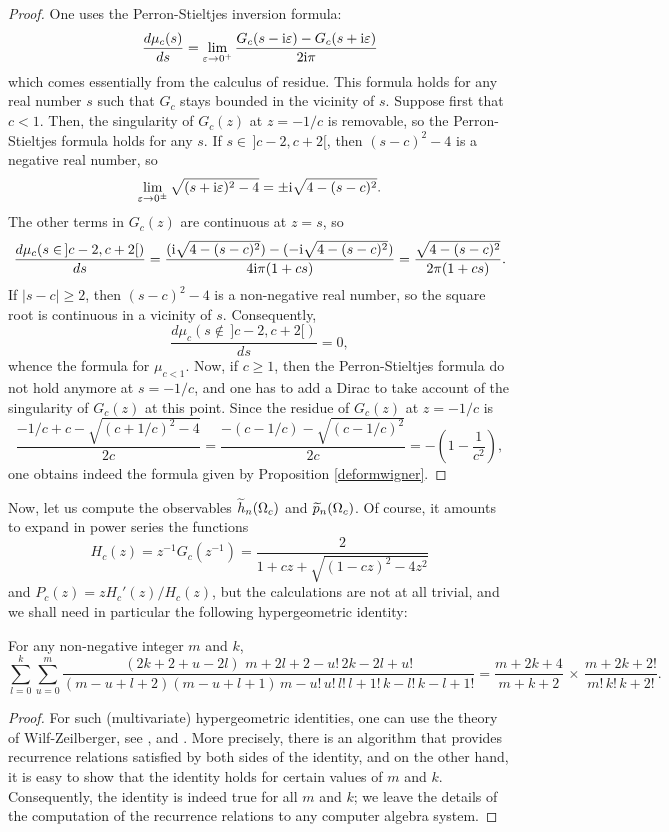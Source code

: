 \documentclass[10pt]{amsart}
\begin{document}
\begin{proof}
One uses the Perron-Stieltjes inversion formula:
$$\frac{d\mu_{c}(s)}{ds}=\lim_{\varepsilon \to 0^{+}}\frac{G_{c}(s-\mathrm{i}\varepsilon)-G_{c}(s+\mathrm{i}\varepsilon)}{2\mathrm{i}\pi}$$
which comes essentially from the calculus of residue. This formula holds for any real number $s$ such that $G_{c}$ stays bounded in the vicinity of $s$. Suppose first that $c< 1$. Then, the singularity of $G_{c}(z)$ at $z=-1/c$ is removable, so the Perron-Stieltjes formula holds for any $s$. If $s \in\, ]c-2,c+2[$, then $(s-c)^{2}-4$ is a negative real number, so
$$\lim_{\varepsilon \to 0^{\pm}}\sqrt{(s+\mathrm{i}\varepsilon)^{2}-4}=\pm \mathrm{i}\sqrt{4-(s-c)^{2}}.$$
The other terms in $G_{c}(z)$ are continuous at $z=s$, so 
$$\frac{d\mu_{c}(s \in \,]c-2,c+2[)}{ds}=\frac{(\mathrm{i}\sqrt{4-(s-c)^{2}}) - (-\mathrm{i}\sqrt{4-(s-c)^{2}})}{4\mathrm{i}\pi(1+cs)}=\frac{\sqrt{4-(s-c)^{2}}}{2\pi(1+cs)}.$$
If $|s-c|\geq 2$, then $(s-c)^{2}-4$ is a non-negative real number, so the square root is continuous in a vicinity of $s$. Consequently, 
$$\frac{d\mu_{c}(s \notin \,]c-2,c+2[)}{ds}=0,$$
whence the formula for $\mu_{c<1}$. Now, if $c\geq 1$, then the Perron-Stieltjes formula do not hold anymore at $s=-1/c$, and one has to add a Dirac to take account of the singularity of $G_{c}(z)$ at this point. Since the residue of $G_{c}(z)$ at $z=-1/c$ is 
$$\frac{-1/c+c-\sqrt{(c+1/c)^{2}-4}}{2c}=\frac{-(c-1/c)-\sqrt{(c-1/c)^{2}}}{2c}=-\left(1-\frac{1}{c^{2}}\right),$$
one obtains indeed the formula given by Proposition \ref{deformwigner}.
\end{proof}\bigskip

Now, let us compute the observables $\widetilde{h}_{n}(\Omega_{c})$ and $\widetilde{p}_{n}(\Omega_{c})$. Of course, it amounts to expand in power series the functions 
$$H_{c}(z)=z^{-1}G_{c}(z^{-1})=\frac{2}{1+cz+\sqrt{(1-cz)^{2}-4z^{2}}}$$
and $P_{c}(z)=zH_{c}'(z)/H_{c}(z)$, but the calculations are not at all trivial, and we shall need in particular the following hypergeometric identity:
\begin{lemma}\label{whatever}
For any non-negative integer $m$ and $k$,
$$\sum_{l=0}^{k}\sum_{u=0}^{m} \frac{(2k+2+u-2l)\,\,m+2l+2-u!\,2k-2l+u!}{(m-u+l+2)(m-u+l+1)\,m-u!\,u!\,l!\,l+1!\,k-l!\,k-l+1!}=  \frac{m+2k+4}{m+k+2}\,\times\,\frac{m+2k+2!}{m!\, k!\,k+2!}.$$
\end{lemma}\medskip

\begin{proof}
For such (multivariate) hypergeometric identities, one can use the theory of Wilf-Zeilberger, see \cite{PWZ97}, \cite{WZ92a} and \cite{WZ92b}. More precisely, there is an algorithm that provides recurrence relations satisfied by both sides of the identity, and on the other hand, it is easy to show that the identity holds for certain values of $m$ and $k$. Consequently, the identity is indeed true for all $m$ and $k$; we leave the details of the computation of the recurrence relations to any computer algebra system.
\end{proof}\bigskip
\end{document}
